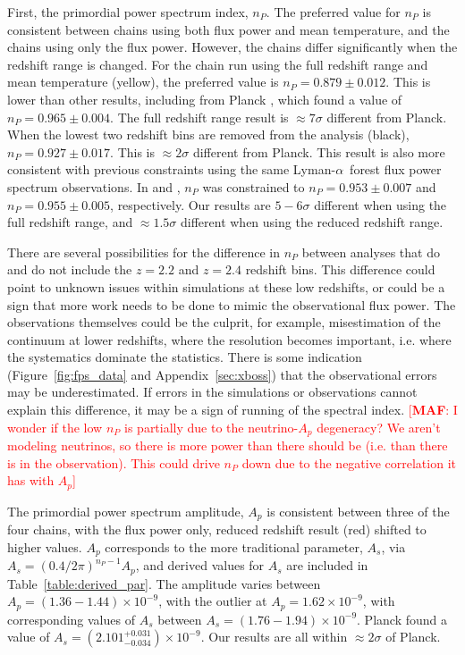 \documentclass[a4paper,11pt]{article}
\newcommand{\lya}{Lyman-$\alpha$\ }
\newcommand{\maf}[1]{{\textcolor{red}{[{\bf MAF}: #1]}}}
\begin{document}
First, the primordial power spectrum index, $n_P$.
The preferred value for $n_P$ is consistent between chains using both flux power and mean temperature, and the chains using only the flux power.
However, the chains differ significantly when the redshift range is changed.
For the chain run using the full redshift range and mean temperature (yellow), the preferred value is $n_P = 0.879\pm0.012$.
This is lower than other results, including from Planck \cite{2020A&A...641A...6P}, which found a value of $n_P=0.965 \pm 0.004$.
The full redshift range result is $\approx7\sigma$ different from Planck.
When the lowest two redshift bins are removed from the analysis (black), $n_P=0.927\pm0.017$.
This is $\approx2\sigma$ different from Planck.
This result is also more consistent with previous constraints using the same \lya forest flux power spectrum observations.
In \cite{2020JCAP...04..038P} and \cite{2019JCAP...07..017C}, $n_P$ was constrained to $n_P = 0.953 \pm 0.007$ and $n_P = 0.955 \pm 0.005$, respectively.
Our results are $5-6\sigma$ different when using the full redshift range, and $\approx1.5\sigma$ different when using the reduced redshift range.

There are several possibilities for the difference in $n_P$ between analyses that do and do not include the $z=2.2$ and $z=2.4$ redshift bins.
This difference could point to unknown issues within simulations at these low redshifts, or could be a sign that more work needs to be done to mimic the observational flux power.
The observations themselves could be the culprit, for example, misestimation of the continuum at lower redshifts, where the resolution becomes important, i.e. where the systematics dominate the statistics.
There is some indication (Figure~\ref{fig:fps_data} and Appendix~\ref{sec:xboss}) that the observational errors may be underestimated.
If errors in the simulations or observations cannot explain this difference, it may be a sign of running of the spectral index.
\maf{I wonder if the low $n_P$ is partially due to the neutrino-$A_p$ degeneracy? We aren't modeling neutrinos, so there is more power than there should be (i.e. than there is in the observation). This could drive $n_P$ down due to the negative correlation it has with $A_p$}

The primordial power spectrum amplitude, $A_p$ is consistent between three of the four chains, with the flux power only, reduced redshift result (red) shifted to higher values.
$A_p$ corresponds to the more traditional parameter, $A_s$, via $A_s = \left(0.4/2\pi\right)^{n_P-1} A_p$, and derived values for $A_s$ are included in Table~\ref{table:derived_par}.
The amplitude varies between $A_p = (1.36-1.44) \times10^{-9}$, with the outlier at $A_p = 1.62 \times10^{-9}$, with corresponding values of $A_s$ between $A_s = (1.76-1.94) \times10^{-9}$.
Planck \cite{2020A&A...641A...6P} found a value of $A_s = \left(2.101^{+0.031}_{-0.034}\right)\times10^{-9}$.
Our results are all within $\approx2\sigma$ of Planck.
\end{document}
